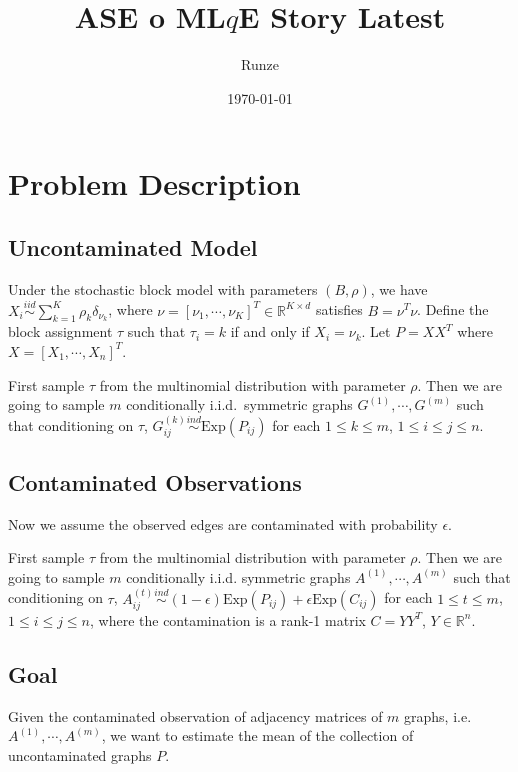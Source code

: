 \documentclass[a4paper]{article}
\title{ASE o ML$q$E Story Latest}
\author{Runze}
\date{\today}
\begin{document}
\maketitle

\section{Problem Description}

\subsection{Uncontaminated Model}
Under the stochastic block model with parameters $(B, \rho)$, we have $X_i \stackrel{iid}{\sim} \sum_{k=1}^K \rho_k \delta_{\nu_k}$, where $\nu = [\nu_1, \cdots, \nu_K]^T \in \mathbb{R}^{K \times d}$ satisfies $B = \nu^T \nu$. Define the block assignment $\tau$ such that $\tau_i = k$ if and only if $X_i = \nu_k$. Let $P = X X^T$ where $X = [X_1, \cdots, X_n]^T$.

First sample $\tau$ from the multinomial distribution with parameter $\rho$. Then we are going to sample $m$ conditionally i.i.d.~symmetric graphs $G^{(1)}, \cdots, G^{(m)}$ such that conditioning on $\tau$, $G^{(k)}_{ij} \stackrel{ind}{\sim} \mathrm{Exp}(P_{ij})$ for each $1 \le k \le m$, $1 \le i \le j \le n$.


\subsection{Contaminated Observations}
Now we assume the observed edges are contaminated with probability $\epsilon$.

First sample $\tau$ from the multinomial distribution with parameter $\rho$. Then we are going to sample $m$ conditionally i.i.d. symmetric graphs $A^{(1)}, \cdots, A^{(m)}$ such that conditioning on $\tau$, $A^{(t)}_{ij} \stackrel{ind}{\sim} (1-\epsilon) \mathrm{Exp}(P_{ij}) + \epsilon \mathrm{Exp}(C_{ij})$ for each $1 \le t \le m$, $1 \le i \le j \le n$,  where the contamination is a rank-1 matrix $C = Y Y^T$, $Y \in \mathbb{R}^n$. 


\subsection{Goal}
Given the contaminated observation of adjacency matrices of $m$ graphs, i.e. $A^{(1)}, \cdots, A^{(m)}$, we want to estimate the mean of the collection of uncontaminated graphs $P$.
\end{document}
